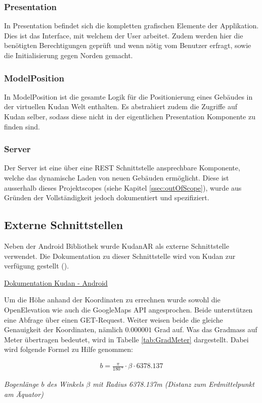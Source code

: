\documentclass[a4paper]{scrreprt}
\newcommand{\myequations}[1]{
	\addcontentsline{equ}{myequations}{\protect\numberline{\theequation}#1}
}
\newcommand{\indexequation}[3]{
	\begin{align} \label{#3} \ensuremath{\boxed{#1}} \end{align}
	\myequations{#3} \centering \small \textit{#2} \normalsize \justify }
\begin{document}
\subsubsection{Presentation}
In Presentation befindet sich die kompletten grafischen Elemente der Applikation. Dies ist das Interface, mit welchem der User arbeitet. Zudem werden hier die benötigten Berechtigungen geprüft und wenn nötig vom Benutzer erfragt, sowie die Initialisierung gegen Norden gemacht. 

\subsubsection{ModelPosition}
In ModelPosition ist die gesamte Logik für die Positionierung eines Gebäudes in der virtuellen Kudan Welt enthalten. Es abstrahiert zudem die Zugriffe auf Kudan selber, sodass diese nicht in der eigentlichen Presentation Komponente zu finden sind.

\subsubsection{Server}
Der Server ist eine über eine REST Schnittstelle ansprechbare Komponente, welche das dynamische Laden von neuen Gebäuden ermöglicht. Diese ist ausserhalb dieses Projektscopes (siehe Kapitel \ref{ssec:outOfScope}), wurde aus Gründen der Vollständigkeit jedoch dokumentiert und spezifiziert.

\subsection{Externe Schnittstellen}
Neben der Android Bibliothek wurde KudanAR als externe Schnittstelle verwendet. Die Dokumentation zu dieser Schnittstelle wird von Kudan zur verfügung gestellt (\cite{KudanAPI}).


\href{https://www.kudan.eu/docs-reference/AndroidDocs/annotated.html}{Dokumentation Kudan - Android}

Um die Höhe anhand der Koordinaten zu errechnen wurde sowohl die OpenElevation wie auch die GoogleMaps API angesprochen. Beide unterstützen eine Abfrage über einen GET-Request. Weiter weisen beide die gleiche Genauigkeit der Koordinaten, nämlich $0.000 001$ Grad auf. Was das Gradmass auf Meter übertragen bedeutet, wird in Tabelle \ref{tab:GradMeter} dargestellt. Dabei wird folgende Formel zu Hilfe genommen:

\indexequation{b = \frac{\pi}{\SI{180}{\degree}}\cdot\beta\cdot 6378.137}{Bogenlänge $b$ des Winkels $\beta$ mit Radius 6378.137m (Distanz zum Erdmittelpunkt am Äquator)}{Bogenlaenge}
\end{document}
